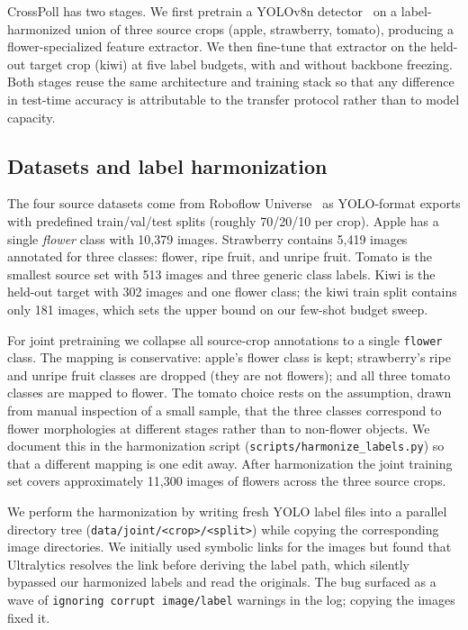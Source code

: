 CrossPoll has two stages. We first pretrain a YOLOv8n detector~\cite{jocher2023ultralytics} on a label-harmonized union of three source crops (apple, strawberry, tomato), producing a flower-specialized feature extractor. We then fine-tune that extractor on the held-out target crop (kiwi) at five label budgets, with and without backbone freezing. Both stages reuse the same architecture and training stack so that any difference in test-time accuracy is attributable to the transfer protocol rather than to model capacity.

\subsection{Datasets and label harmonization}

The four source datasets come from Roboflow Universe~\cite{roboflow2024} as YOLO-format exports with predefined train/val/test splits (roughly 70/20/10 per crop). Apple has a single \emph{flower} class with 10{,}379 images. Strawberry contains 5{,}419 images annotated for three classes: flower, ripe fruit, and unripe fruit. Tomato is the smallest source set with 513 images and three generic class labels. Kiwi is the held-out target with 302 images and one flower class; the kiwi train split contains only 181 images, which sets the upper bound on our few-shot budget sweep.

For joint pretraining we collapse all source-crop annotations to a single \texttt{flower} class. The mapping is conservative: apple's flower class is kept; strawberry's ripe and unripe fruit classes are dropped (they are not flowers); and all three tomato classes are mapped to flower. The tomato choice rests on the assumption, drawn from manual inspection of a small sample, that the three classes correspond to flower morphologies at different stages rather than to non-flower objects. We document this in the harmonization script (\texttt{scripts/harmonize\_labels.py}) so that a different mapping is one edit away. After harmonization the joint training set covers approximately 11{,}300 images of flowers across the three source crops.

We perform the harmonization by writing fresh YOLO label files into a parallel directory tree (\texttt{data/joint/<crop>/<split>}) while copying the corresponding image directories. We initially used symbolic links for the images but found that Ultralytics resolves the link before deriving the label path, which silently bypassed our harmonized labels and read the originals. The bug surfaced as a wave of \texttt{ignoring corrupt image/label} warnings in the log; copying the images fixed it.

